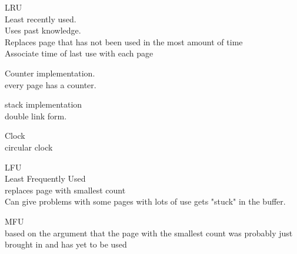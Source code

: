 \documentclass[a4paper,10pt,titlepage]{report}
\begin{document}
\hspace{10mm}LRU \\
\hspace{15mm}Least recently used. \\
\hspace{15mm}Uses past knowledge.\\ 
\hspace{15mm}Replaces page that has not been used in the most amount of time \\
\hspace{15mm}Associate time of last use with each page\\
\vspace{5mm}




\hspace{10mm}Counter implementation.\\
 \hspace{15mm}   every page has a counter. \\
\vspace{5mm}





\hspace{10mm}stack implementation  \\
\hspace{15mm}    double link form. \\
    \vspace{5mm}
    
    
\hspace{10mm}Clock \\
\hspace{15mm}circular clock  \\
\vspace{5mm}


\hspace{10mm}LFU \\
\hspace{15mm}Least Frequently Used \\
\hspace{15mm}replaces page with smallest count \\
\hspace{15mm}Can give problems with some pages with lots of use gets "stuck" in the buffer. \\
\vspace{5mm}




\hspace{10mm}MFU \\
\hspace{15mm}based on the argument that the page with the smallest count was probably just brought in and has yet to be used \\
\vspace{5mm}
\end{document}

